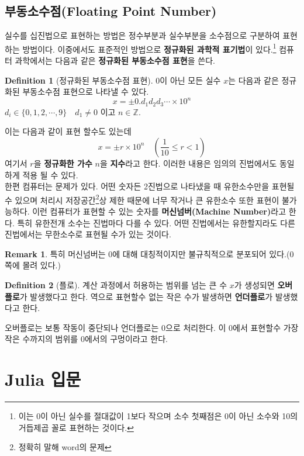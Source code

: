 \documentclass[a4paper, 11pt]{report}
\theoremstyle{definition}
\newtheorem*{defn}{Definition}
\newtheorem*{rmk}{Remark}
\begin{document}
\section{부동소수점(Floating Point Number)}
실수를 십진법으로 표현하는 방법은 정수부분과 실수부분을 소수점으로 구분하여 표현하는 방법이다.
이중에서도 표준적인 방법으로 \textbf{정규화된 과학적 표기법}이 있다.\footnote{이는 0이 아닌 실수를 절대값이 1보다 작으며 소수 첫째점은 0이 아닌 소수와 10의 거듭제곱 꼴로 표현하는 것이다.}
컴퓨터 과학에서는 다음과 같은 \textbf{정규화된 부동소수점 표현}을 쓴다.  
\begin{defn}[정규화된 부동소수점 표현]
$0$이 아닌 모든 실수 $x$는 다음과 같은 정규화된 부동소수점 표현으로 나타낼 수 있다.
\begin{equation}
    x = \pm 0.d_1d_2d_3\cdots \times 10^n
\end{equation}
$d_i \in \{0, 1, 2, \cdots ,9\} \quad d_1 \neq 0$ 이고 $n \in \mathbb{Z}$.
\end{defn}
이는 다음과 같이 표현 할수도 있는데 
\[
    x = \pm r \times 10^n \quad (\frac{1}{10} \leq r < 1)
\]
여기서 $r$을 \textbf{정규화한 가수} $n$을 \textbf{지수}라고 한다. 
이러한 내용은 임의의 진법에서도 동일하게 적용 될 수 있다. \\
한편 컴퓨터는 문제가 있다. 어떤 숫자든 2진법으로 나타냈을 때 유한소수만을 표현될 수 있으며
처리시 저장공간\footnote{정확히 말해 word의 문제}상 제한 때문에 너무 작거나 큰 유한소수 또한 표현이 불가능하다.
이런 컴퓨터가 표현할 수 있는 숫자를 \textbf{머신넘버(Machine Number)}라고 한다. 특히 유한전개 소수는 진법마다 다를 수 있다.
어떤 진법에서는 유한할지라도 다른 진법에서는 무한소수로 표현될 수가 있는 것이다. 
\begin{rmk}
    특히 머신넘버는 0에 대해 대칭적이지만 불규칙적으로 분포되어 있다.(0쪽에 몰려 있다.)
\end{rmk}
\begin{defn}[플로]
    계산 과정에서 허용하는 범위를 넘는 큰 수 $x$가 생성되면 \textbf{오버플로}가 발생했다고 한다.
    역으로 표현할수 없는 작은 수가 발생하면 \textbf{언더플로}가 발생했다고 한다.
\end{defn}
오버플로는 보통 작동이 중단되나 언더플로는 0으로 처리한다. 이 0에서 표현할수 가장 작은 수까지의 범위를 0에서의 구멍이라고 한다.


\appendix


\chapter{Julia  입문}
\end{document}
